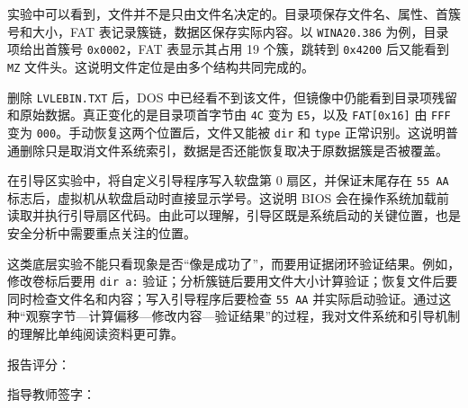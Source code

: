 \documentclass[12pt]{ctexart}
\begin{document}
\vspace{0.35cm}


实验中可以看到，文件并不是只由文件名决定的。目录项保存文件名、属性、首簇号和大小，FAT 表记录簇链，数据区保存实际内容。以 \texttt{WINA20.386} 为例，目录项给出首簇号 \texttt{0x0002}，FAT 表显示其占用 19 个簇，跳转到 \texttt{0x4200} 后又能看到 \texttt{MZ} 文件头。这说明文件定位是由多个结构共同完成的。

\vspace{0.35cm}


删除 \texttt{LVLEBIN.TXT} 后，DOS 中已经看不到该文件，但镜像中仍能看到目录项残留和原始数据。真正变化的是目录项首字节由 \texttt{4C} 变为 \texttt{E5}，以及 \texttt{FAT[0x16]} 由 \texttt{FFF} 变为 \texttt{000}。手动恢复这两个位置后，文件又能被 \texttt{dir} 和 \texttt{type} 正常识别。这说明普通删除只是取消文件系统索引，数据是否还能恢复取决于原数据簇是否被覆盖。

\vspace{0.35cm}


在引导区实验中，将自定义引导程序写入软盘第 0 扇区，并保证末尾存在 \texttt{55 AA} 标志后，虚拟机从软盘启动时直接显示学号。这说明 BIOS 会在操作系统加载前读取并执行引导扇区代码。由此可以理解，引导区既是系统启动的关键位置，也是安全分析中需要重点关注的位置。

\vspace{0.35cm}


这类底层实验不能只看现象是否“像是成功了”，而要用证据闭环验证结果。例如，修改卷标后要用 \texttt{dir a:} 验证；分析簇链后要用文件大小计算验证；恢复文件后要同时检查文件名和内容；写入引导程序后要检查 \texttt{55 AA} 并实际启动验证。通过这种“观察字节—计算偏移—修改内容—验证结果”的过程，我对文件系统和引导机制的理解比单纯阅读资料更可靠。

    \vspace{1.2cm}

\begin{flushright}
    {\heiti{} 报告评分：}\qquad\qquad\qquad\qquad

    \vspace{1.2cm}

    {\heiti{} 指导教师签字：}\qquad\qquad\qquad
\end{flushright}
\end{document}
